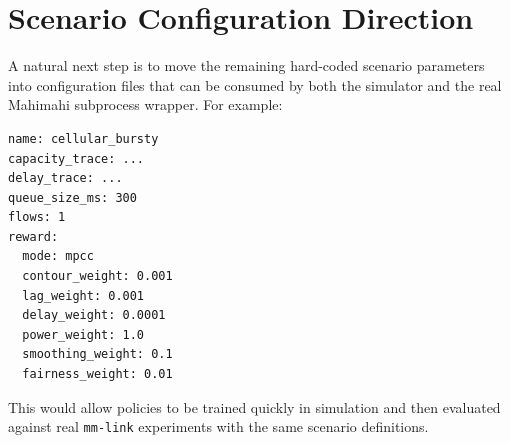 \documentclass[11pt]{article}
\begin{document}
\section{Scenario Configuration Direction}

A natural next step is to move the remaining hard-coded scenario parameters into
configuration files that can be consumed by both the simulator and the real
Mahimahi subprocess wrapper. For example:

\begin{verbatim}
name: cellular_bursty
capacity_trace: ...
delay_trace: ...
queue_size_ms: 300
flows: 1
reward:
  mode: mpcc
  contour_weight: 0.001
  lag_weight: 0.001
  delay_weight: 0.0001
  power_weight: 1.0
  smoothing_weight: 0.1
  fairness_weight: 0.01
\end{verbatim}

This would allow policies to be trained quickly in simulation and then evaluated
against real \texttt{mm-link} experiments with the same scenario definitions.
\end{document}
